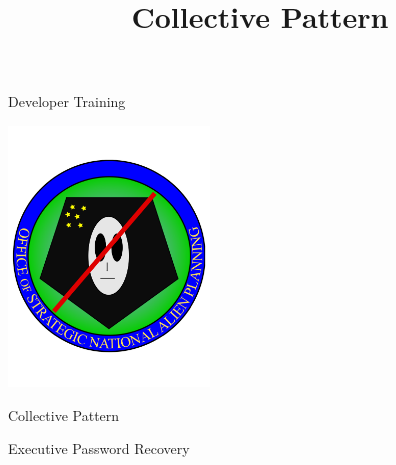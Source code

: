 \documentclass[xcolor=dvipsnames]{beamer}
\begin{document}
	\title[Collective Pattern]{Collective Pattern}
	\author[]{\className}
	\institute[\className]{\departmentName}
	\date{} 


	\begin{frame}
		\maketitle
	\end{frame}
	
	\begin{frame}{Developer Training}
		\begin{center}
			\includegraphics[width=0.4\textwidth]{images/OSNAP_logo} 
			
			Collective Pattern
			
			Executive Password Recovery
		\end{center}
	\end{frame}
	
\end{document}

